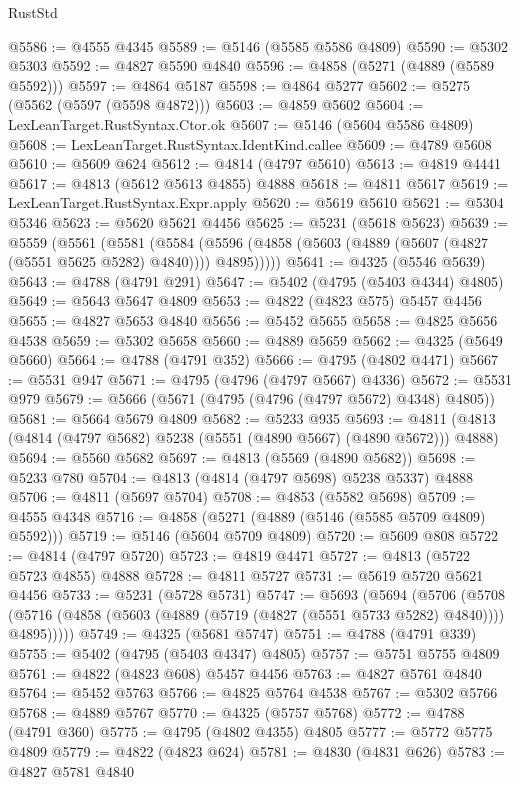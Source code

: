 \begin{lexlean}{RustStd}
\begin{coremodule}
@5586 := @4555 @4345
@5589 := @5146 (@5585 @5586 @4809)
@5590 := @5302 @5303
@5592 := @4827 @5590 @4840
@5596 := @4858 (@5271 (@4889 (@5589 @5592)))
@5597 := @4864 @5187
@5598 := @4864 @5277
@5602 := @5275 (@5562 (@5597 (@5598 @4872)))
@5603 := @4859 @5602
@5604 := LexLeanTarget.RustSyntax.Ctor.ok
@5607 := @5146 (@5604 @5586 @4809)
@5608 := LexLeanTarget.RustSyntax.IdentKind.callee
@5609 := @4789 @5608
@5610 := @5609 @624
@5612 := @4814 (@4797 @5610)
@5613 := @4819 @4441
@5617 := @4813 (@5612 @5613 @4855) @4888
@5618 := @4811 @5617
@5619 := LexLeanTarget.RustSyntax.Expr.apply
@5620 := @5619 @5610
@5621 := @5304 @5346
@5623 := @5620 @5621 @4456
@5625 := @5231 (@5618 @5623)
@5639 := @5559
    (@5561
      (@5581
        (@5584 (@5596 (@4858 (@5603 (@4889 (@5607 (@4827 (@5551 @5625 @5282) @4840)))) @4895)))))
@5641 := @4325 (@5546 @5639)
@5643 := @4788 (@4791 @291)
@5647 := @5402 (@4795 (@5403 @4344) @4805)
@5649 := @5643 @5647 @4809
@5653 := @4822 (@4823 @575) @5457 @4456
@5655 := @4827 @5653 @4840
@5656 := @5452 @5655
@5658 := @4825 @5656 @4538
@5659 := @5302 @5658
@5660 := @4889 @5659
@5662 := @4325 (@5649 @5660)
@5664 := @4788 (@4791 @352)
@5666 := @4795 (@4802 @4471)
@5667 := @5531 @947
@5671 := @4795 (@4796 (@4797 @5667) @4336)
@5672 := @5531 @979
@5679 := @5666 (@5671 (@4795 (@4796 (@4797 @5672) @4348) @4805))
@5681 := @5664 @5679 @4809
@5682 := @5233 @935
@5693 := @4811 (@4813 (@4814 (@4797 @5682) @5238 (@5551 (@4890 @5667) (@4890 @5672))) @4888)
@5694 := @5560 @5682
@5697 := @4813 (@5569 (@4890 @5682))
@5698 := @5233 @780
@5704 := @4813 (@4814 (@4797 @5698) @5238 @5337) @4888
@5706 := @4811 (@5697 @5704)
@5708 := @4853 (@5582 @5698)
@5709 := @4555 @4348
@5716 := @4858 (@5271 (@4889 (@5146 (@5585 @5709 @4809) @5592)))
@5719 := @5146 (@5604 @5709 @4809)
@5720 := @5609 @808
@5722 := @4814 (@4797 @5720)
@5723 := @4819 @4471
@5727 := @4813 (@5722 @5723 @4855) @4888
@5728 := @4811 @5727
@5731 := @5619 @5720 @5621 @4456
@5733 := @5231 (@5728 @5731)
@5747 := @5693
    (@5694
      (@5706
        (@5708 (@5716 (@4858 (@5603 (@4889 (@5719 (@4827 (@5551 @5733 @5282) @4840)))) @4895)))))
@5749 := @4325 (@5681 @5747)
@5751 := @4788 (@4791 @339)
@5755 := @5402 (@4795 (@5403 @4347) @4805)
@5757 := @5751 @5755 @4809
@5761 := @4822 (@4823 @608) @5457 @4456
@5763 := @4827 @5761 @4840
@5764 := @5452 @5763
@5766 := @4825 @5764 @4538
@5767 := @5302 @5766
@5768 := @4889 @5767
@5770 := @4325 (@5757 @5768)
@5772 := @4788 (@4791 @360)
@5775 := @4795 (@4802 @4355) @4805
@5777 := @5772 @5775 @4809
@5779 := @4822 (@4823 @624)
@5781 := @4830 (@4831 @626)
@5783 := @4827 @5781 @4840

\end{coremodule}
\end{lexlean}
